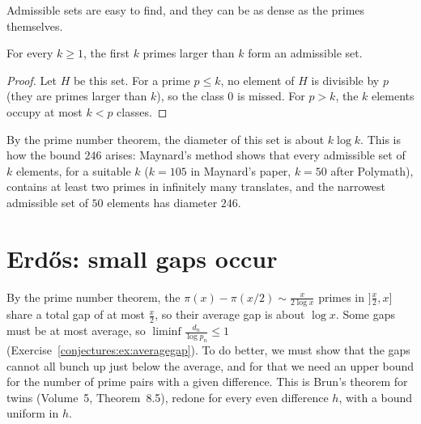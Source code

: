 Admissible sets are easy to find, and they can be as dense as the primes themselves.

\begin{proposition}\label{conjectures:prop:firstprimes}
For every $k\ge1$, the first $k$ primes larger than $k$ form an admissible set.
\end{proposition}
\begin{proof}
Let $H$ be this set. For a prime $p\le k$, no element of $H$ is divisible by $p$ (they are primes larger than $k$), so the class $0$ is missed. For
$p>k$, the $k$ elements occupy at most $k<p$ classes.
\end{proof}

By the prime number theorem, the diameter of this set is about $k\log k$. This is how the bound $246$ arises: Maynard's method shows that every
admissible set of $k$ elements, for a suitable $k$ ($k=105$ in Maynard's paper, $k=50$ after Polymath), contains at least two primes in infinitely many
translates, and the narrowest admissible set of $50$ elements has diameter $246$.

\section{Erd\H{o}s: small gaps occur}

By the prime number theorem, the $\pi(x)-\pi(x/2)\sim\frac x{2\log x}$ primes in $]\frac x2,x]$ share a total gap of at most $\frac x2$, so their average
gap is about $\log x$. Some gaps must be at most average, so $\liminf\frac{d_n}{\log p_n}\le1$ (Exercise~\ref{conjectures:ex:averagegap}). To do better, we must
show that the gaps cannot all bunch up just below the average, and for that we need an upper bound for the number of prime pairs with a given
difference. This is Brun's theorem for twins (Volume~5, Theorem~8.5), redone for every even difference $h$, with a bound uniform in $h$.


